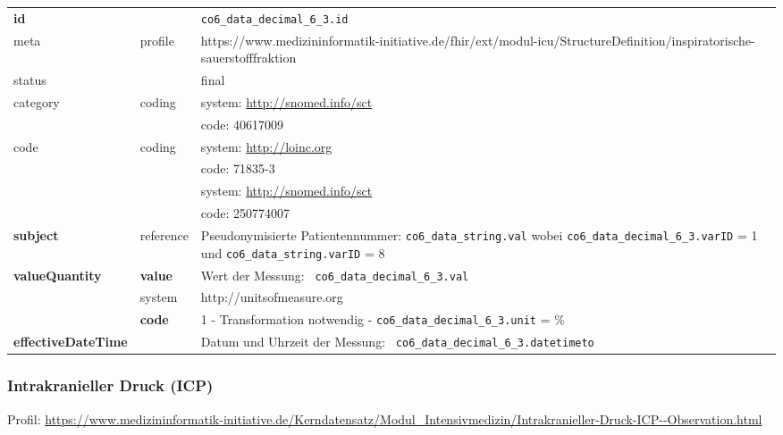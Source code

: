 \begin{longtable}{|l|l|p{7.5cm}|}
	\hline
	\rowcolor{lightgray} \multicolumn{3}{|l|}{Data Mapping (inhaltlich)} \\ \hline
	\textbf{id} &  & \texttt{co6\_data\_decimal\_6\_3.id} \\ \hline
	meta & profile & https://www.medizininformatik-initiative.de/fhir/ext/modul-icu/StructureDefinition/inspiratorische-sauerstofffraktion \\ \hline 
	status &  & final   \\ \hline 
	category & coding & system: \url{http://snomed.info/sct} \\
	\cline{3-3}
	& & code: 40617009 \\ \hline
	code & coding & system: \url{http://loinc.org} \\ 
	\cline{3-3} 
	&  & code: 71835-3 \\ 
	\cline{3-3} 
	&  & system: \url{http://snomed.info/sct} \\ 
	\cline{3-3} 
	&  & code: 250774007 \\ \hline
	\textbf{subject} & reference & Pseudonymisierte Patientennummer: \texttt{co6\_data\_string.val} wobei \texttt{co6\_data\_decimal\_6\_3.varID} = 1 und \texttt{co6\_data\_string.varID} = 8 \\ \hline
	\textbf{valueQuantity}  & \textbf{value} & Wert der Messung: \texttt{
		co6\_data\_decimal\_6\_3.val} \\
	\cline{2-3}
	& system & http://unitsofmeasure.org \\
	\cline{2-3}
	& \textbf{code} & 1 - Transformation notwendig - \texttt{co6\_data\_decimal\_6\_3.unit} = \%
	\\ \hline
	\textbf{effectiveDateTime}  & & Datum und Uhrzeit der Messung: \texttt{
		co6\_data\_decimal\_6\_3.datetimeto} \\
	\hline
\end{longtable}

\subsubsection{Intrakranieller Druck (ICP)} 
 Profil: \url{https://www.medizininformatik-initiative.de/Kerndatensatz/Modul_Intensivmedizin/Intrakranieller-Druck-ICP--Observation.html}


